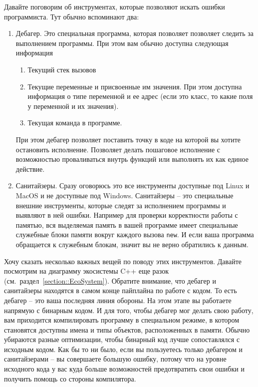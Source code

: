 Давайте поговорим об инструментах, которые позволяют искать ошибки программиста.
Тут обычно вспоминают два:
\begin{enumerate}
\item Дебагер.
Это специальная программа, которая позволяет позволяет следить за выполнением программы.
При этом вам обычно доступна следующая информация
\begin{enumerate}
\item Текущий стек вызовов

\item Текущие переменные и присвоенные им значения.
При этом доступна информация о типе переменной и ее адрес (если это класс, то какие поля у переменной и их значения).

\item Текущая команда в программе.
\end{enumerate}
При этом дебагер позволяет поставить точку в коде на которой вы хотите остановить исполнение.
Позволяет делать пошаговое исполнение с возможностью проваливаться внутрь функций или выполнять их как единое действие.

\item Санитайзеры.
Сразу оговорюсь это все инструменты доступные под Linux и MacOS и не доступные под Windows.
Санитайзеры -- это специальные внешние инструменты, которые следят за исполнением программы и выявляют в ней ошибки.
Например для проверки корректности работы с памятью, вся выделяемая память в вашей программе имеет специальные служебные блоки памяти вокруг каждого вызова \verb"new".
И если ваша программа обращается к служебным блокам, значит вы не верно обратились к данным.
\end{enumerate}
Хочу сказать несколько важных вещей по поводу этих инструментов.
Давайте посмотрим на диаграмму экосистемы C++ еще разок (см.~раздел~\ref{section::EcoSystem}).
Обратите внимание, что дебагер и санитайзеры находятся в самом конце пайплайна по работе с кодом.
То есть дебагер -- это ваша последняя линия обороны.
На этом этапе вы работаете напрямую с бинарным кодом.
И для того, чтобы дебагер мог делать свою работу, вам приходится компилировать программу в специальном режиме, в котором становятся доступны имена и типы объектов, расположенных в памяти.
Обычно убираются разные оптимизации, чтобы бинарный код лучше сопоставлялся с исходным кодом.
Как бы то ни было, если вы пользуетесь только дебагером и санитайзерами -- вы совершаете большую ошибку, потому что на уровне исходного кода у вас куда больше возможностей предотвратить свои ошибки и получить помощь со стороны компилятора.

